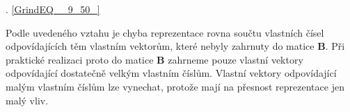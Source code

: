  . \eqref{GrindEQ__9_50_}

\noindent Podle uvedeného vztahu je chyba reprezentace rovna součtu vlastních čísel odpovídajících těm vlastním vektorům, které nebyly zahrnuty do matice \textbf{B}. Při praktické realizaci proto do matice \textbf{B} zahrneme pouze vlastní vektory odpovídající dostatečně velkým vlastním číslům. Vlastní vektory odpovídající malým vlastním číslům lze vynechat, protože mají na přesnost reprezentace jen malý vliv.

\noindent 
